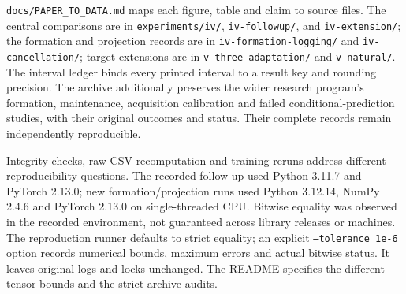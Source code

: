 \texttt{docs/PAPER\_TO\_DATA.md} maps each figure, table and claim to source files. The central comparisons are in \texttt{experiments/iv/}, \texttt{iv-followup/}, and \texttt{iv-extension/}; the formation and projection records are in \texttt{iv-formation-logging/} and \texttt{iv-cancellation/}; target extensions are in \texttt{v-three-adaptation/} and \texttt{v-natural/}. The interval ledger binds every printed interval to a result key and rounding precision. The archive additionally preserves the wider research program's formation, maintenance, acquisition calibration and failed conditional-prediction studies, with their original outcomes and status. Their complete records remain independently reproducible.

Integrity checks, raw-CSV recomputation and training reruns address different reproducibility questions. The recorded follow-up used Python 3.11.7 and PyTorch 2.13.0; new formation/projection runs used Python 3.12.14, NumPy 2.4.6 and PyTorch 2.13.0 on single-threaded CPU. Bitwise equality was observed in the recorded environment, not guaranteed across library releases or machines. The reproduction runner defaults to strict equality; an explicit \texttt{--tolerance 1e-6} option records numerical bounds, maximum errors and actual bitwise status. It leaves original logs and locks unchanged. The README specifies the different tensor bounds and the strict archive audits.

